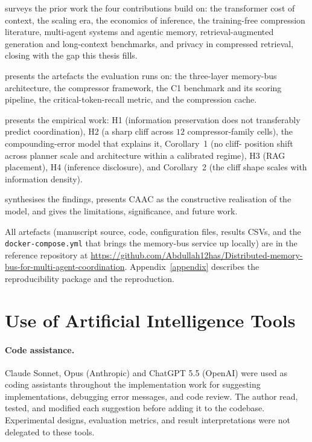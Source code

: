  surveys the prior work the four contributions
build on: the transformer cost of context, the scaling era, the
economics of inference, the training-free compression literature,
multi-agent systems and agentic memory, retrieval-augmented
generation and long-context benchmarks, and privacy in compressed
retrieval, closing with the gap this thesis fills.

 presents the artefacts the evaluation runs
on: the three-layer memory-bus architecture, the compressor
framework, the C1 benchmark and its scoring pipeline, the
critical-token-recall metric, and the compression cache.

 presents the empirical work: H1 (information
preservation does not transferably predict coordination), H2 (a
sharp cliff across $12$ compressor-family cells), the
compounding-error model that explains it, Corollary~1 (no cliff-%
position shift across planner scale and architecture within a
calibrated regime), H3 (RAG placement), H4 (inference disclosure),
and Corollary~2 (the cliff shape scales with information density).

 synthesises the findings, presents CAAC as the
constructive realisation of the model, and gives the limitations,
significance, and future work.


All artefacts (manuscript source, code, configuration files,
results CSVs, and the \texttt{docker-compose.yml} that brings the
memory-bus service up locally) are in the reference repository at
\url{https://github.com/Abdullah12has/Distributed-memory-bus-for-multi-agent-coordination}.
Appendix~\ref{appendix} describes the reproducibility package and the reproduction.

\section{Use of Artificial Intelligence Tools}
\label{sec:ai_use}

\paragraph{Code assistance.}
Claude Sonnet, Opus (Anthropic) and ChatGPT 5.5 (OpenAI) were used as coding assistants
throughout the implementation work for suggesting implementations, debugging
error messages, and code review. The author read, tested, and
modified each suggestion before adding it to the codebase. Experimental designs, evaluation
metrics, and result interpretations were not delegated to these tools.


